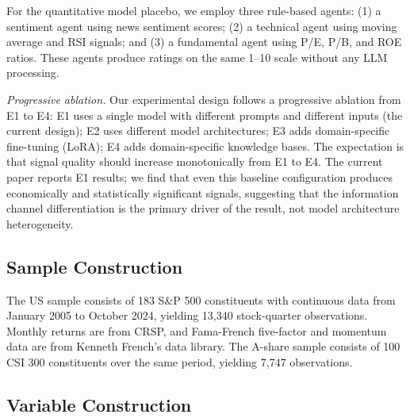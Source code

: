 \documentclass[12pt,a4paper]{article}
\begin{document}
For the quantitative model placebo, we employ three rule-based agents: (1) a sentiment agent using news sentiment scores; (2) a technical agent using moving average and RSI signals; and (3) a fundamental agent using P/E, P/B, and ROE ratios. These agents produce ratings on the same 1--10 scale without any LLM processing.

\textit{Progressive ablation.} Our experimental design follows a progressive ablation from E1 to E4: E1 uses a single model with different prompts and different inputs (the current design); E2 uses different model architectures; E3 adds domain-specific fine-tuning (LoRA); E4 adds domain-specific knowledge bases. The expectation is that signal quality should increase monotonically from E1 to E4. The current paper reports E1 results; we find that even this baseline configuration produces economically and statistically significant signals, suggesting that the information channel differentiation is the primary driver of the result, not model architecture heterogeneity.

\subsection{Sample Construction}

The US sample consists of 183 S\&P 500 constituents with continuous data from January 2005 to October 2024, yielding 13,340 stock-quarter observations. Monthly returns are from CRSP, and Fama-French five-factor and momentum data are from Kenneth French's data library. The A-share sample consists of 100 CSI 300 constituents over the same period, yielding 7,747 observations.

\subsection{Variable Construction}
\end{document}
